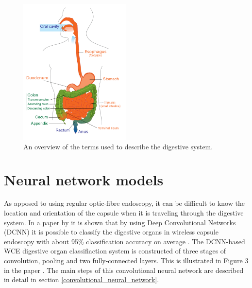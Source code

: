 \documentclass[english, a4paper]{article}
\begin{document}
\begin{figure}[h] %
  \begin{center}
    \includegraphics[width=0.5\textwidth]{digestive-system}
    \caption[Image]{An overview of the terms used to describe the digestive system\footnotemark.}
    \label{fig:digestive_system}
  \end{center}
\end{figure}



\section{Neural network models} \label{neural_network_models}
As apposed to using regular optic-fibre endoscopy, it can be difficult to know the location and orientation of the capsule when it is traveling through the digestive system. In a paper by \citeauthor*{ClassifyingDigestive15} it is shown that by using Deep Convolutional Networks (DCNN) it is possible to classify the digestive organs in wireless capsule endoscopy with about 95\% classification accuracy on average \cite{ClassifyingDigestive15}.
The DCNN-based WCE digestive organ classifiaction system is constructed of three stages of convolution, pooling and two fully-connected layers. This is illustrated in Figure 3 in the paper \cite{ClassifyingDigestive15}. The main steps of this convolutional neural network are described in detail in section \ref{convolutional_neural_network}.
\end{document}
